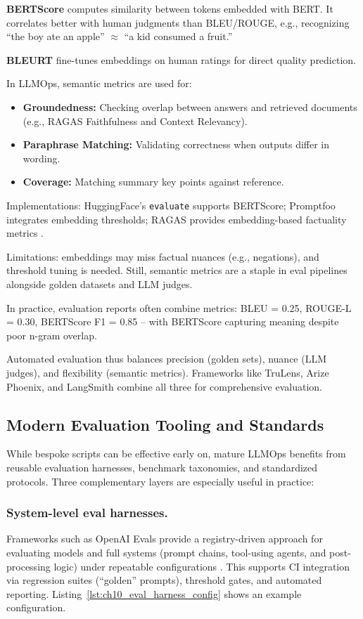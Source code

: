 \textbf{BERTScore} \cite{githubBERT,openreviewBERT,aclanthology3} computes similarity between tokens embedded with BERT. It correlates better with human judgments than BLEU/ROUGE, e.g., recognizing “the boy ate an apple” $\approx$ “a kid consumed a fruit.”  

\textbf{BLEURT} fine-tunes embeddings on human ratings for direct quality prediction.  

In LLMOps, semantic metrics are used for:  
\begin{itemize}
    \item \textbf{Groundedness:} Checking overlap between answers and retrieved documents (e.g., RAGAS Faithfulness and Context Relevancy).  
    \item \textbf{Paraphrase Matching:} Validating correctness when outputs differ in wording.  
    \item \textbf{Coverage:} Matching summary key points against reference.  
\end{itemize}  

Implementations: HuggingFace’s \texttt{evaluate} supports BERTScore; Promptfoo integrates embedding thresholds; RAGAS provides embedding-based factuality metrics \cite{huggingfaceEval}.  

Limitations: embeddings may miss factual nuances (e.g., negations), and threshold tuning is needed. Still, semantic metrics are a staple in eval pipelines alongside golden datasets and LLM judges.  

In practice, evaluation reports often combine metrics: BLEU = 0.25, ROUGE-L = 0.30, BERTScore F1 = 0.85 – with BERTScore capturing meaning despite poor n-gram overlap.  

Automated evaluation thus balances precision (golden sets), nuance (LLM judges), and flexibility (semantic metrics). Frameworks like TruLens, Arize Phoenix, and LangSmith combine all three for comprehensive evaluation.  

\subsection{Modern Evaluation Tooling and Standards}\label{sec:ch10-modern-eval}
While bespoke scripts can be effective early on, mature LLMOps benefits from reusable evaluation harnesses, benchmark taxonomies,
and standardized protocols. Three complementary layers are especially useful in practice:

\subsubsection{System-level eval harnesses.}
Frameworks such as OpenAI Evals provide a registry-driven approach for evaluating models and full systems (prompt chains,
tool-using agents, and post-processing logic) under repeatable configurations \cite{openai_evals,openai_evals_cookbook}.
This supports CI integration via regression suites (``golden'' prompts), threshold gates, and automated reporting.
Listing~\ref{lst:ch10_eval_harness_config} shows an example configuration.

